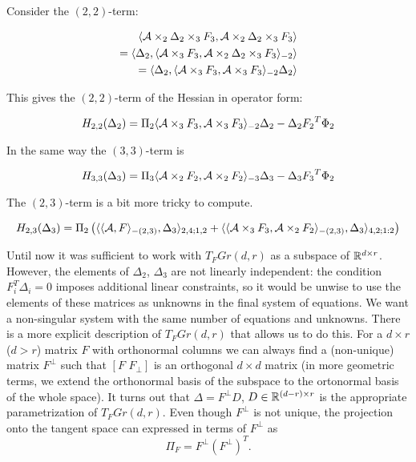 Consider the $(2,2)$-term:

\begin{eqnarray*}
\langle \mathcal{A} \times_2 \Delta{_2} \times_3 {F_3}, \mathcal{A} \times_2 \Delta{_2} \times_3 {F_3} \rangle \\
= \langle \Delta{_2}, \langle \mathcal{A} \times_3 {F_3}, \mathcal{A} \times_2 \Delta{_2} \times_3 {F_3} \rangle_{-2} \rangle \\
 = \langle \Delta{_2}, \langle \mathcal{A} \times_3 {F_3}, \mathcal{A}  \times_3 {F_3} \rangle_{-2} \Delta{_2} \rangle
\end{eqnarray*}

This gives the $(2,2)$-term of the Hessian in operator form:

\begin{equation}
H_{2,2}(\Delta{_2}) = \Pi{_2} \langle \mathcal{A} \times_3 {F_3}, \mathcal{A} \times_3 {F_3} \rangle_{-2} \Delta{_2} - \Delta{_2} {F_2}^T \Phi{_2}
\end{equation}

In the same way the $(3,3)$-term is

\begin{equation}
{H}_{3,3}(\Delta{_3}) = \Pi{_3} \langle \mathcal{A} \times_2 {F_2}, \mathcal{A} \times_2 {F_2} \rangle_{-3} \Delta{_3} - \Delta{_3} {F_3}^T \Phi{_2}
\end{equation}

The $(2,3)$-term is a bit more tricky to compute.

\begin{equation}
H_{2,3}(\Delta{_3}) = \Pi{_2} \left( \langle  \langle \mathcal{A}, F \rangle_{-(2,3)}, \Delta{_3} \rangle_{2,4;1,2}    
+ \langle \langle \mathcal{A} \times_3 {F_3}, \mathcal{A} \times_2 {F_2} \rangle_{-(2,3)}, \Delta{_3} \rangle_{4,2;1:2} \right)
\end{equation}

Until now it was sufficient to work with $T_F Gr(d,r)$ as a subspace of  $\mathbb{R}^{d \times r}$.
However, the elements of $\Delta_2$, $\Delta_3$ are not linearly independent:
the condition $F_i^T \Delta_i = 0$ imposes additional linear constraints,
so it would be unwise to use the elements of these matrices as unknowns
in the final system of equations. We want a non-singular system
with the same number of equations and unknowns. There is a more explicit description
of $T_F Gr(d, r)$ that allows us to do this.  For a $d \times r$ ($d > r$) matrix
$F$ with orthonormal columns we can always find a (non-unique) matrix $F^{\bot}$ such that $[ F \,\, F_{\bot} ]$
is an orthogonal $d \times d$ matrix (in more geometric terms, we extend the orthonormal
basis of the subspace to the ortonormal basis of the whole space). It turns out that
$\Delta = F^{\bot} D$, $D \in \mathbb{R}^{(d-r) \times r}$ is the appropriate parametrization
of $T_F Gr(d, r)$. 
Even though $F^{\bot}$ is not unique, the projection onto the tangent space
can expressed in terms of $F^{\bot}$ as
\begin{equation}
    \Pi_F = F^{\bot} (F^{\bot})^T.
\end{equation}


